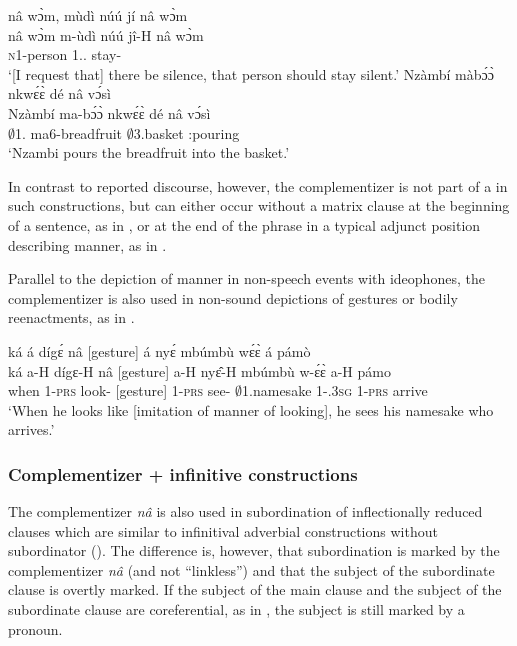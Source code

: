 \ea\label{IDEOna1}
  \glll nâ wɔ̀m, mùdì núú jí nâ wɔ̀m\\
       nâ wɔ̀m m-ùdì núú jî-H nâ wɔ̀m \\
        {\COMP} {\IDEO} \textsc{n}1-person 1.{\DEM}.{\DIST} stay-{\R} {\COMP} {\IDEO} \\
   \trans `[I request that] there be silence, that person should stay silent.'
\ex\label{IDEOna2}
  \glll Nzàmbí màbɔ́ɔ̀ nkwɛ́ɛ̀ dé nâ vɔ́sì \\
        Nzàmbí ma-bɔ́ɔ̀ nkwɛ́ɛ̀ dé nâ vɔ́sì \\
          $\emptyset$1.{\PN} ma6-breadfruit $\emptyset$3.basket {\LOC} {\COMP} {\IDEO}:pouring\\
    \trans `Nzambi pours the breadfruit into the basket.'
\z

In contrast to reported discourse, however, the complementizer is not part of a {\QI} in such constructions, but can either occur without a matrix clause at the beginning of a sentence, as in , or at the end of the phrase in a typical adjunct position describing manner, as in .



 Parallel to the depiction of manner in non-speech events with ideophones, the complementizer is also used in non-sound depictions of gestures or bodily reenactments, as in .


\ea\label{Gest}
  \glll ká á dígɛ́ nâ [gesture] á nyɛ́ mbúmbù wɛ́ɛ̀ á pámò \\
  ká a-H dígɛ-H nâ [gesture] a-H nyɛ̂-H mbúmbù w-ɛ́ɛ̀ a-H pámo\\
       when 1-\textsc{prs} look-{\R} {\COMP} [gesture]  1-\textsc{prs} see-{\R} $\emptyset$1.namesake 1-{\POSS}.3\textsc{sg} 1-\textsc{prs} arrive \\
    \trans `When he looks like [imitation of manner of looking], he sees his namesake who arrives.'
\z




\subsubsection{Complementizer + infinitive constructions}
\label{sec:COMPINF}

The complementizer {\itshape nâ} is also used in subordination of inflectionally reduced clauses which are similar to infinitival adverbial constructions without subordinator (). The difference is, however, that subordination is marked by the complementizer {\itshape nâ} (and not ``linkless'') and that the subject of the subordinate clause is overtly marked. If the subject of the main clause and the subject of the subordinate clause are coreferential,  as in , the subject is still marked by a pronoun.


